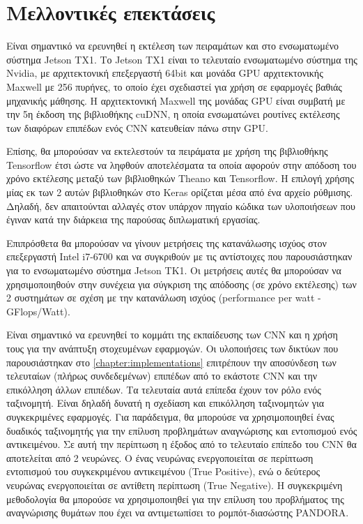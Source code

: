 \chapter{Μελλοντικές επεκτάσεις}
\label{chapter:future_work}

Είναι σημαντικό να ερευνηθεί η εκτέλεση των πειραμάτων και στο ενσωματωμένο σύστημα
Jetson TΧ1. Το Jetson TX1 είναι το τελευταίο ενσωματωμένο σύστημα της Nvidia,
με αρχιτεκτονική επεξεργαστή 64bit και μονάδα GPU αρχιτεκτονικής Maxwell με
256 πυρήνες, το οποίο έχει σχεδιαστεί για χρήση σε εφαρμογές βαθιάς
μηχανικής μάθησης. Η αρχιτεκτονική Maxwell της μονάδας GPU είναι συμβατή
με την 5η έκδοση της βιβλιοθήκης cuDNN, η οποία ενσωματώνει ρουτίνες
εκτέλεσης των διαφόρων επιπέδων ενός CNN κατευθείαν πάνω στην GPU.

Επίσης, θα μπορούσαν να εκτελεστούν τα πειράματα με χρήση της βιβλιοθήκης
Tensorflow έτσι ώστε να ληφθούν αποτελέσματα τα οποία αφορούν στην απόδοση
του χρόνο εκτέλεσης μεταξύ των βιβλιοθηκών Theano και Tensorflow.
Η επιλογή χρήσης μίας εκ των 2 αυτών βιβλιοθηκών στο Keras ορίζεται μέσα από
ένα αρχείο ρύθμισης. Δηλαδή, δεν απαιτούνται αλλαγές στον υπάρχον πηγαίο κώδικα
των υλοποιήσεων που έγιναν κατά την διάρκεια της παρούσας διπλωματική εργασίας.

Επιπρόσθετα θα μπορούσαν να γίνουν μετρήσεις της κατανάλωσης ισχύος στον
επεξεργαστή Intel i7-6700 και να συγκριθούν με τις αντίστοιχες
που παρουσιάστηκαν για το ενσωματωμένο σύστημα Jetson TK1. Οι
μετρήσεις αυτές θα μπορούσαν να χρησιμοποιηθούν στην συνέχεια για σύγκριση
της απόδοσης (σε χρόνο εκτέλεσης) των 2 συστημάτων σε σχέση με την κατανάλωση
ισχύος (performance per watt - GFlops/Watt).

Είναι σημαντικό να ερευνηθεί το κομμάτι της εκπαίδευσης των CNN
και η χρήση τους για την ανάπτυξη στοχευμένων εφαρμογών.
Οι υλοποιήσεις των δικτύων που παρουσιάστηκαν στο \autoref{chapter:implementations}
επιτρέπουν την αποσύνδεση των τελευταίων (πλήρως συνδεδεμένων) επιπέδων από
το εκάστοτε CNN και την επικόλληση άλλων επιπέδων.
Τα τελευταία αυτά επίπεδα έχουν τον ρόλο ενός ταξινομητή. Είναι δηλαδή
δυνατή η σχεδίαση και επικόλληση ταξινομητών για συγκεκριμένες εφαρμογές.
Για παράδειγμα, θα μπορούσε να χρησιμοποιηθεί ένας δυαδικός ταξινομητής
για την επίλυση προβλημάτων αναγνώρισης και εντοπισμού ενός αντικειμένου. Σε αυτή
την περίπτωση η έξοδος από το τελευταίο επίπεδο του CNN θα αποτελείται
από 2 νευρώνες. Ο ένας νευρώνας ενεργοποιείται σε περίπτωση εντοπισμού
του συγκεκριμένου αντικειμένου (True Positive), ενώ ο δεύτερος νευρώνας ενεργοποιείται
σε αντίθετη περίπτωση (True Negative). Η συγκεκριμένη μεθοδολογία θα μπορούσε
να χρησιμοποιηθεί για την επίλυση του προβλήματος της αναγνώρισης θυμάτων
που έχει να αντιμετωπίσει το ρομπότ-διασώστης PANDORA.

